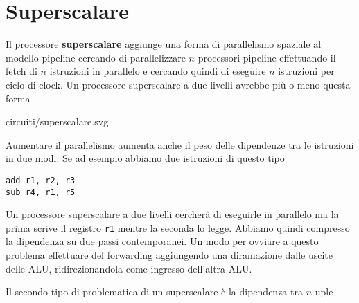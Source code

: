\section{Superscalare}
Il processore \textbf{superscalare} aggiunge una forma di parallelismo spaziale al modello pipeline
cercando di parallelizzare $n$ processori pipeline effettuando il fetch di $n$ istruzioni in
parallelo e cercando quindi di eseguire $n$ istruzioni per ciclo di clock. Un processore
superscalare a due livelli avrebbe più o meno questa forma
\begin{center}
	 {circuiti/superscalare.svg}
\end{center}
Aumentare il parallelismo aumenta anche il peso delle dipendenze tra le istruzioni in due modi. Se
ad esempio abbiamo due istruzioni di questo tipo
\begin{verbatim}
add r1, r2, r3
sub r4, r1, r5
\end{verbatim}
Un processore superscalare a due livelli cercherà di eseguirle in parallelo ma la prima scrive il
registro \verb|r1| mentre la seconda lo legge. Abbiamo quindi compresso la dipendenza su due passi
contemporanei. Un modo per ovviare a questo problema effettuare del forwarding aggiungendo una
diramazione dalle uscite delle ALU, ridirezionandola come ingresso dell'altra ALU.

Il secondo tipo di problematica di un superscalare è la dipendenza tra $n$-uple